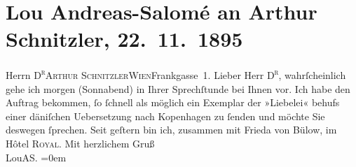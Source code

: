 

         
         \renewcommand{\erwaehntePersonen}{Personen: Frieda von Bülow}
         \renewcommand{\erwaehnteOrte}{Orte: Dänemark, Frankgasse 1, Hotel Royal, I., Innere Stadt, IX., Alsergrund, Kopenhagen, Wien}
         \renewcommand{\erwaehnteWerke}{Werke: Liebelei. Schauspiel in drei Akten}
               \section[Lou Andreas-Salomé an Arthur Schnitzler, 22. 11. 1895]{ Lou Andreas-Salomé an Arthur Schnitzler, 22. 11. 1895}\nopagebreak{}\rehead{ }\begin{ledgroupsized}[t]{13cm}\normalsize\beginnumbering \toendnotes[C]{\smallbreak\pagebreak[2]} 
\pstart{}{\pb}Herrn \textsc{D\textsuperscript{r}}\pend{}\pstart{}\textsc{Arthur Schnitzler}\pend{}\pstart{}\textsc{Wien}\pend{}\pstart{}Frankgasse 1. \pend{}{\bigskip}\pstart
           \noindent{}{\pb}Lieber Herr \textsc{D\textsuperscript{r}}, wahrſcheinlich gehe ich morgen (Sonnabend) in Ihrer Sprechſtunde bei Ihnen
               vor. Ich habe den Auftrag bekommen, ſo ſchnell als möglich ein Exemplar
               der »Liebelei« behufs einer däniſchen Uebersetzung nach Kopenhagen zu ſenden und möchte Sie deswegen ſprechen. Seit geſtern bin ich,
               zusammen mit Frieda von Bülow, im Hôtel \textsc{Royal}.\pend
           \pstart
           Mit herzlichem Gruß{\\[\baselineskip]}\spacefill\mbox{LouAS.}\pend
           \leftskip=0em{}
         
         \endnumbering{}\end{ledgroupsized}  \newcommand{\dateiname}{L00514}\newcommand{\titel}{Lou Andreas-Salomé an Arthur Schnitzler, 22. 11. 1895}\newcommand{\editorInnen}{Martin Anton Müller und Gerd-Hermann Susen}
      
